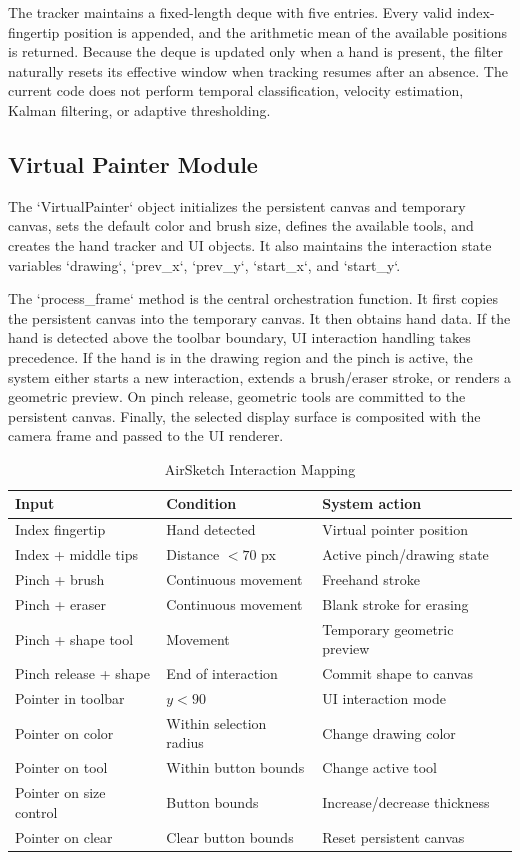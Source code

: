 \documentclass[conference]{IEEEtran}
\begin{document}
The tracker maintains a fixed-length deque with five entries. Every valid index-fingertip position is appended, and the arithmetic mean of the available positions is returned. Because the deque is updated only when a hand is present, the filter naturally resets its effective window when tracking resumes after an absence. The current code does not perform temporal classification, velocity estimation, Kalman filtering, or adaptive thresholding.

\subsection{Virtual Painter Module}
The `VirtualPainter` object initializes the persistent canvas and temporary canvas, sets the default color and brush size, defines the available tools, and creates the hand tracker and UI objects. It also maintains the interaction state variables `drawing`, `prev\_x`, `prev\_y`, `start\_x`, and `start\_y`.

The `process\_frame` method is the central orchestration function. It first copies the persistent canvas into the temporary canvas. It then obtains hand data. If the hand is detected above the toolbar boundary, UI interaction handling takes precedence. If the hand is in the drawing region and the pinch is active, the system either starts a new interaction, extends a brush/eraser stroke, or renders a geometric preview. On pinch release, geometric tools are committed to the persistent canvas. Finally, the selected display surface is composited with the camera frame and passed to the UI renderer.


\begin{table}[t]
\caption{AirSketch Interaction Mapping}
\label{tab:interaction}
\centering
\scriptsize
\begin{tabular}{p{1.45cm}p{1.65cm}p{2.55cm}}
\toprule
\textbf{Input} & \textbf{Condition} & \textbf{System action}\\
\midrule
Index fingertip & Hand detected & Virtual pointer position\\
Index + middle tips & Distance $<70$ px & Active pinch/drawing state\\
Pinch + brush & Continuous movement & Freehand stroke\\
Pinch + eraser & Continuous movement & Blank stroke for erasing\\
Pinch + shape tool & Movement & Temporary geometric preview\\
Pinch release + shape & End of interaction & Commit shape to canvas\\
Pointer in toolbar & $y<90$ & UI interaction mode\\
Pointer on color & Within selection radius & Change drawing color\\
Pointer on tool & Within button bounds & Change active tool\\
Pointer on size control & Button bounds & Increase/decrease thickness\\
Pointer on clear & Clear button bounds & Reset persistent canvas\\
\bottomrule
\end{tabular}
\end{table}
\end{document}
